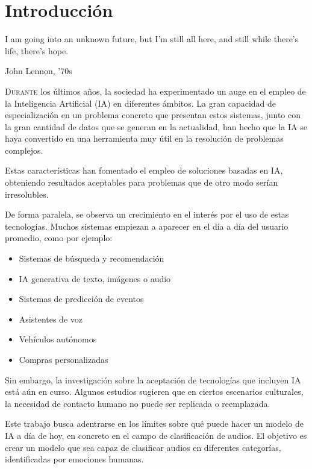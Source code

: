 \chapter{Introducción}\label{chp-01}
\epigraph{I am going into an unknown future, but I'm still all here, and still while there's life, there's hope.}{John Lennon, '70s}

\lettrine[lraise=-0.1, lines=2, loversize=0.2]{D}{urante} los últimos años, la sociedad ha experimentado un auge en el empleo de la Inteligencia Artificial (IA) en diferentes ámbitos. 
La gran capacidad de especialización en un problema concreto que presentan estos sistemas, junto con la gran cantidad de datos que se generan en la actualidad, han hecho que la IA se haya convertido en una herramienta muy útil en la resolución de problemas complejos.

Estas características han fomentado el empleo de soluciones basadas en IA, obteniendo resultados aceptables para problemas que de otro modo serían irresolubles.

De forma paralela, se observa un crecimiento en el interés por el uso de estas tecnologías.
Muchos sistemas empiezan a aparecer en el día a día del usuario promedio, como por ejemplo: \cite{VIU_article}

\begin{itemize}\itemsep1pt \parskip0pt 
\item Sistemas de búsqueda y recomendación
\item IA generativa de texto, imágenes o audio
\item Sistemas de predicción de eventos
\item Asistentes de voz
\item Vehículos autónomos
\item Compras personalizadas
\end{itemize}

Sin embargo, la investigación sobre la aceptación de tecnologías que incluyen IA está aún en curso. 
Algunos estudios sugieren que en ciertos escenarios culturales, la necesidad de contacto humano no puede ser replicada o reemplazada. \cite{KELLY2023101925}

Este trabajo busca adentrarse en los límites sobre qué puede hacer un modelo de IA a día de hoy, en concreto en el campo de clasificación de audios.
El objetivo es crear un modelo que sea capaz de clasificar audios en diferentes categorías, identificadas por emociones humanas. 

